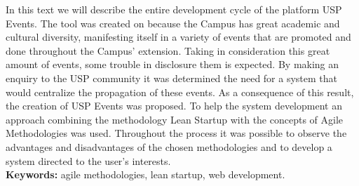 \documentclass[12pt,twoside,a4paper]{book}
\begin{document}
\par In this text we will describe the entire development cycle of the platform USP Events. The tool was created on because the Campus has great academic and cultural diversity, manifesting itself in a variety of events that are promoted and done throughout the Campus’ extension. Taking in consideration this great amount of events, some trouble in disclosure them is expected. By making an enquiry to the USP community it was determined the need for a system that would centralize the propagation of these events. As a consequence of this result, the creation of USP Events was proposed. To help the system development an approach combining the methodology Lean Startup with the concepts of Agile Methodologies was used. Throughout the process it was possible to observe the advantages and disadvantages of the chosen methodologies and to develop a system directed to the user’s interests.
\\

\noindent \textbf{Keywords:} agile methodologies, lean startup, web development.

\tableofcontents    %


\end{document}
